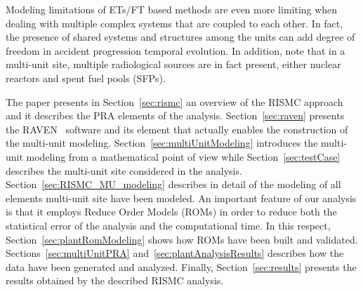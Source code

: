 Modeling limitations of ETs/FT based methods are even more limiting when dealing with 
multiple complex systems that are coupled to each other. In fact, the presence of shared 
systems and structures among the units can add degree of freedom in accident progression 
temporal evolution.
In addition, note that in a multi-unit site, multiple radiological sources are in fact present, 
either nuclear reactors and spent fuel pools (SFPs). 

The paper presents in Section~\ref{sec:rismc} an overview of the RISMC approach and it describes
the PRA elements of the analysis. Section~\ref{sec:raven} presents the RAVEN~\cite{RAVEN_PSAM_2014} 
software and its element that actually enables the construction of the multi-unit modeling. 
Section~\ref{sec:multiUnitModeling} introduces the multi-unit modeling from a mathematical 
point of view while Section~\ref{sec:testCase} describes the multi-unit site considered in the
analysis.
Section~\ref{sec:RISMC_MU_modeling} describes in detail of the modeling of all elements multi-unit
site have been modeled.
An important feature of our analysis is that it employs Reduce Order Models (ROMs) in order to
reduce both the statistical error of the analysis and the computational time. In this respect,
Section~\ref{sec:plantRomModeling} shows how ROMs have been built and validated.
Sections~\ref{sec:multiUnitPRA} and~\ref{sec:plantAnalysisResults} describes how the data have been 
generated and analyzed.
Finally, Section~\ref{sec:results} presents the results obtained by the described RISMC analysis.
 



